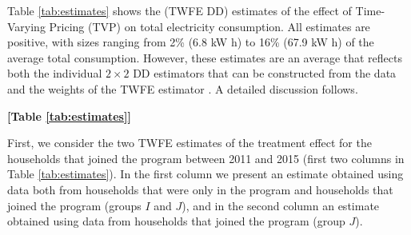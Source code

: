 \documentclass[12pt]{article}
\begin{document}
Table \ref{tab:estimates} shows the (TWFE DD) estimates of the effect of Time-Varying Pricing (TVP) on total electricity consumption. All estimates are positive, with sizes ranging from 2\%  (6.8 kW h) to 16\% (67.9 kW h) of the average total consumption. However, these estimates are an average that reflects both the individual $2 \times 2$  DD estimators that can be constructed from the data and the weights of the TWFE estimator \citep{goodman-baconDifferenceinDifferencesVariationTreatment2018}. A detailed discussion follows.

\centerline{\textbf{[Table \ref{tab:estimates}]}}


First, we consider the two TWFE estimates of the treatment effect for the households that joined the program between 2011 and 2015 (first two columns in Table \ref{tab:estimates}). In the first column we present an estimate obtained using data both from households that were only in the program and households that joined the program (groups $I$ and $J$), and in the second column an estimate obtained using data from households that joined the program (group $J$).
\end{document}
